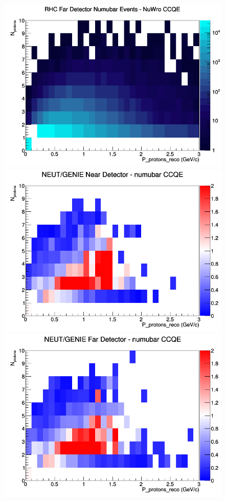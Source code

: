 \begin{figure}[h]
\endminipage
{}
\includegraphics[width=\linewidth]{eff_N_P/LAr/protons/CCQE_RHC_FD_numubar_N_P_NuWro.png}
\endminipage
\newline
{}
\includegraphics[width=\linewidth]{eff_N_P/LAr/protons/ratios/CCQE_NEUT_GENIE_numubar_near_N_P.png}
\endminipage
{}
\includegraphics[width=\linewidth]{eff_N_P/LAr/protons/ratios/CCQE_NEUT_GENIE_numubar_far_N_P.png}

\end{figure}
